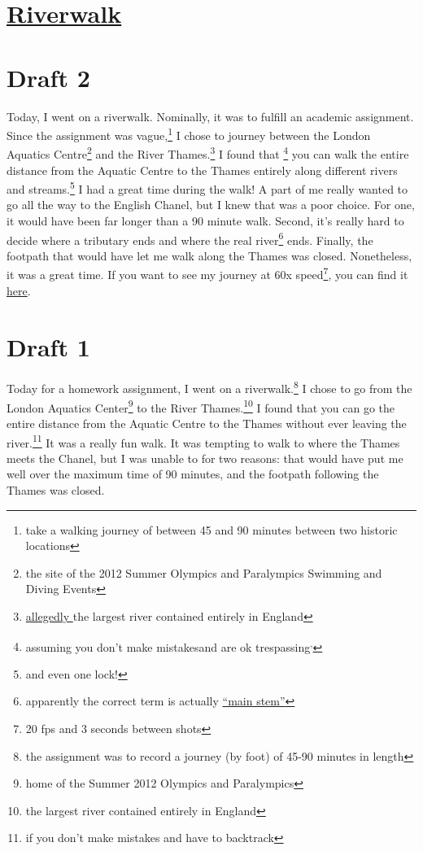 \documentclass[12pt]{article}[titlepage]
\newcommand{\say}[1]{``#1''}
\newcommand{\1}{\={a}}
\newcommand{\2}{\={e}}
\newcommand{\3}{\={\i}}
\newcommand{\4}{\=o}
\newcommand{\5}{\=u}
\newcommand{\6}{\={A}}
\renewcommand{\,}{\textsuperscript{,}}
\begin{document}
\doublespacing

\section{\href{riverwalk.html}{Riverwalk}}
\section{Draft 2}
Today, I went on a riverwalk.
Nominally, it was to fulfill an academic assignment.
Since the assignment was vague,\footnote{take a walking journey of between 45 and 90 minutes between two historic locations} I chose to journey between the London Aquatics Centre\footnote{the site of the 2012 Summer Olympics and Paralympics Swimming and Diving Events} and the River Thames.\footnote{\href{https://en.wikipedia.org/wiki/River_Thames}{allegedly }the largest river contained entirely in England}
I found that
\footnote{assuming you don't make mistakes\footnotemark and are ok trespassing\footnotemark\,\footnotemark}
you can walk the entire distance from the Aquatic Centre to the Thames entirely along different rivers and streams.\footnote{and even one lock!}
I had a great time during the walk!
A part of me really wanted to go all the way to the English Chanel, but I knew that was a poor choice.
For one, it would have been far longer than a 90 minute walk.
Second, it's really hard to decide where a tributary ends and where the real river\footnote{apparently the correct term is actually \href{https://en.wikipedia.org/wiki/Main_stem}{\say{main stem}}} ends.
Finally, the footpath that would have let me walk along the Thames was closed.
Nonetheless, it was a great time.
If you want to see my journey at 60x speed\footnote{20 fps and 3 seconds between shots}, you can find it \href{https://vimeo.com/288755224}{here}.

\section{Draft 1}
Today for a homework assignment, I went on a riverwalk.\footnote{the assignment was to record a journey (by foot) of 45-90 minutes in length}
I chose to go from the London Aquatics Center\footnote{home of the Summer 2012 Olympics and Paralympics} to the River Thames.\footnote{the largest river contained entirely in England}
I found that you can go the entire distance from the Aquatic Centre to the Thames without ever leaving the river.\footnote{if you don't make mistakes and have to backtrack\footnotemark}
It was a really fun walk.
It was tempting to walk to where the Thames meets the Chanel, but I was unable to for two reasons: that would have put me well over the maximum time of 90 minutes, and the footpath following the Thames was closed.
\end{document}
